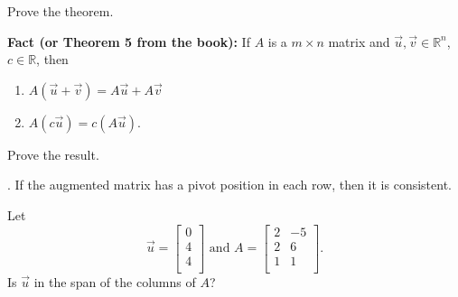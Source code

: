 \documentclass[12pt,letterpaper]{article}
\begin{document}
\begin{enumerate}
\Problem Prove the theorem.

\newpage

{\bf Fact (or Theorem 5 from the book):} If $A$ is a $m \times n$ matrix and $\vec{u}, \vec{v} \in \mathbb{R}^n$, $c\in \mathbb{R}$, then
\begin{enumerate}
\item $A(\vec{u} +\vec{v})=A\vec{u} +A\vec{v}$
\item $A(c \vec{u}) =c (A\vec{u}).$
\end{enumerate}

\Problem Prove the result.

\vfill

. If the augmented matrix has a pivot position in each row, then it is consistent.

\vfill

\Problem Let $$\vec{u} =\begin{bmatrix} 0 \\ 4 \\ 4\\ \end{bmatrix} \text{ and } A=\begin{bmatrix} 2 & -5\\ 2 & 6\\ 1 & 1\\ \end{bmatrix}.$$ Is $\vec{u}$ in the span of the columns of $A$?

\vfill


\end{enumerate}


\newpage
{}%
\lhead{}
\rhead{}
\thispagestyle{fancy}
\end{document}
